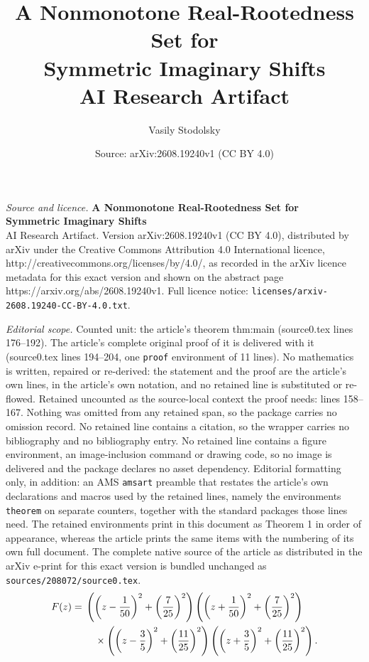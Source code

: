 \documentclass[10pt,a4paper]{amsart}
\title{\textbf{A Nonmonotone Real-Rootedness Set for\\ Symmetric Imaginary Shifts}\\[0.7em] \large\textnormal{AI Research Artifact}}
\author{Vasily Stodolsky}
\date{Source: arXiv:2608.19240v1 (CC BY 4.0)}
\begin{document}
\maketitle

\noindent\emph{Source and licence.} \textbf{A Nonmonotone Real-Rootedness Set for\\ Symmetric Imaginary Shifts}\\[0.7em] \large\textnormal{AI Research Artifact}. Version arXiv:2608.19240v1 (CC BY 4.0), distributed by arXiv under the Creative Commons Attribution 4.0 International licence, http://creativecommons.org/licenses/by/4.0/, as recorded in the arXiv licence metadata for this exact version and shown on the abstract page https://arxiv.org/abs/2608.19240v1. Full licence notice: \texttt{licenses/arxiv-2608.19240-CC-BY-4.0.txt}.\par\smallskip

\noindent\textit{Editorial scope.} Counted unit: the article's theorem thm:main (source0.tex lines 176--192). The article's complete original proof of it is delivered with it (source0.tex lines 194--204, one \texttt{proof} environment of 11 lines). No mathematics is written, repaired or re-derived: the statement and the proof are the article's own lines, in the article's own notation, and no retained line is substituted or re-flowed.  Retained uncounted as the source-local context the proof needs: lines 158--167.  Nothing was omitted from any retained span, so the package carries no omission record.  No retained line contains a citation, so the wrapper carries no bibliography and no bibliography entry.  No retained line contains a figure environment, an image-inclusion command or drawing code, so no image is delivered and the package declares no asset dependency.  Editorial formatting only, in addition: an AMS \texttt{amsart} preamble that restates the article's own declarations and macros used by the retained lines, namely the environments \texttt{theorem} on separate counters, together with the standard packages those lines need.  The retained environments print in this document as Theorem 1 in order of appearance, whereas the article prints the same items with the numbering of its own full document.  The complete native source of the article as distributed in the arXiv e-print for this exact version is bundled unchanged as \texttt{sources/208072/source0.tex}.
\begin{align}
F(z)={}&
\left(\left(z-\frac1{50}\right)^2+\left(\frac7{25}\right)^2\right)
\left(\left(z+\frac1{50}\right)^2+\left(\frac7{25}\right)^2\right)
\notag\\
&\quad\times
\left(\left(z-\frac35\right)^2+\left(\frac{11}{25}\right)^2\right)
\left(\left(z+\frac35\right)^2+\left(\frac{11}{25}\right)^2\right).
\label{eq:F}
\end{align}
\end{document}
